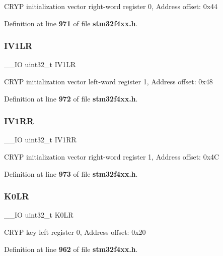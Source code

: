 C\+R\+YP initialization vector right-\/word register 0, Address offset\+: 0x44 

Definition at line \textbf{ 971} of file \textbf{ stm32f4xx.\+h}.

\mbox{\label{structCRYP__TypeDef_aad2f43335b25a0065f3d327364610cbd}} 
\subsubsection{I\+V1\+LR}
{\footnotesize\ttfamily \+\_\+\+\_\+\+IO uint32\+\_\+t I\+V1\+LR}

C\+R\+YP initialization vector left-\/word register 1, Address offset\+: 0x48 

Definition at line \textbf{ 972} of file \textbf{ stm32f4xx.\+h}.

\mbox{\label{structCRYP__TypeDef_a38a9f05c03174023fc6ac951c04eaeff}} 
\subsubsection{I\+V1\+RR}
{\footnotesize\ttfamily \+\_\+\+\_\+\+IO uint32\+\_\+t I\+V1\+RR}

C\+R\+YP initialization vector right-\/word register 1, Address offset\+: 0x4C 

Definition at line \textbf{ 973} of file \textbf{ stm32f4xx.\+h}.

\mbox{\label{structCRYP__TypeDef_a3ca109e86323625e5f56f92f999c3b05}} 
\subsubsection{K0\+LR}
{\footnotesize\ttfamily \+\_\+\+\_\+\+IO uint32\+\_\+t K0\+LR}

C\+R\+YP key left register 0, Address offset\+: 0x20 

Definition at line \textbf{ 962} of file \textbf{ stm32f4xx.\+h}.

\mbox{\label{structCRYP__TypeDef_ae6d97d339f0091d4a105001ea59086ae}} 
